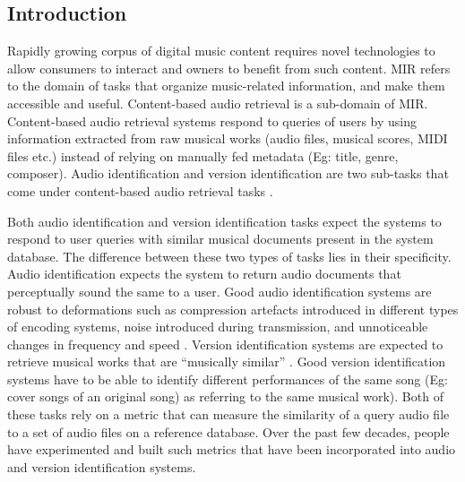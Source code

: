 \documentclass[../main.tex]{subfiles}
\begin{document}
\subsection{Introduction}

\par
Rapidly growing corpus of digital music content requires novel technologies to allow consumers to interact and owners to benefit from such content. \gls{MIR} refers to the domain of tasks that organize music-related information, and make them accessible and useful. Content-based audio retrieval is a sub-domain of \gls{MIR}. Content-based audio retrieval systems respond to queries of users by using information extracted from raw musical works (audio files, musical scores, \gls{MIDI} files etc.) instead of relying on manually fed metadata (Eg: title, genre, composer). Audio identification and version identification are two sub-tasks that come under content-based audio retrieval tasks \cite{book}.

\par
Both audio identification and version identification tasks expect the systems to respond to user queries with similar musical documents present in the system database. The difference between these two types of tasks lies in their specificity. Audio identification expects the system to return audio documents that perceptually sound the same to a user. Good audio identification systems are robust to deformations such as compression artefacts introduced in different types of encoding systems, noise introduced during transmission, and unnoticeable changes in frequency and speed \cite{book}. Version identification systems are expected to retrieve musical works that are “musically similar” \cite{serraAudioCoverSong2010}. Good version identification systems have to be able to identify different performances of the same song (Eg: cover songs of an original song) as referring to the same musical work). Both of these tasks rely on a metric that can measure the similarity of a query audio file to a set of audio files on a reference database. Over the past few decades, people have experimented and built such metrics that have been incorporated into audio and version identification systems.
\end{document}
